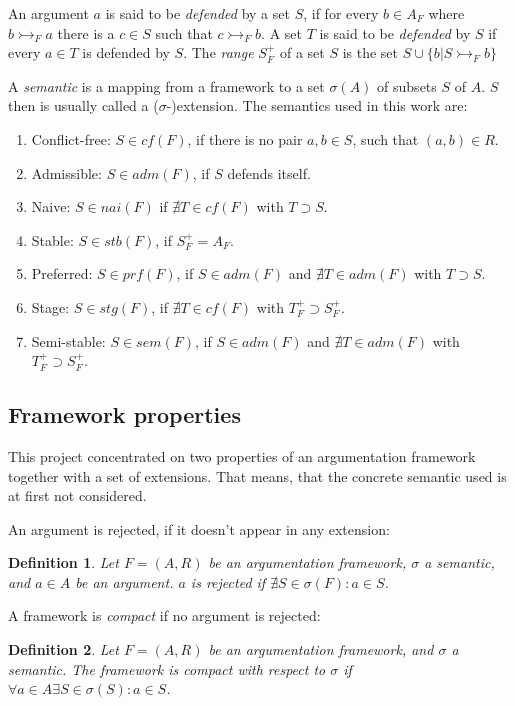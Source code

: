 \documentclass{scrartcl}
\newtheorem{definition}{Definition}
\begin{document}
An argument $a$ is said to be \emph{defended} by a set $S$, if for every $b \in
A_F$ where $b \rightarrowtail_F a$ there is a $c \in S$ such that $c
\rightarrowtail_F b$. A set $T$ is said to be \emph{defended} by $S$ if every
$a \in T$ is defended by $S$. The \emph{range} $S_F^{+}$ of a set $S$ is the
set $S \cup\{b | S \rightarrowtail_F b\}$

A \emph{semantic} is a mapping from a framework to a set $\sigma(A)$ of subsets
$S$ of $A$.  $S$ then is usually called a ($\sigma$-)extension. The semantics
used in this work are:
\begin{enumerate}
  \item Conflict-free: $S \in cf(F)$, if there is no pair $a,b \in S$, such that
      $(a,b) \in R$.
  \item Admissible: $S \in adm(F)$, if $S$ defends itself.
  \item Naive: $S \in nai(F)$ if $\nexists T\in cf(F)$ with $T \supset S$.
  \item Stable: $S \in stb(F)$, if $S_F^{+} = A_F$.
  \item Preferred: $S \in prf(F)$, if $S \in adm(F)$ and $\nexists T\in adm(F)$
      with $T \supset S$.
  \item Stage: $S \in stg(F)$, if $\nexists T\in cf(F)$ with $T_F^{+} \supset
      S_F^{+}$.
  \item Semi-stable: $S \in sem(F)$, if $S \in adm(F)$ and $\nexists T\in
      adm(F)$ with $T_F^{+} \supset S_F^{+}$.
\end{enumerate}

\subsection{Framework properties}

This project concentrated on two properties of an argumentation framework
together with a set of extensions. That means, that the concrete semantic used
is at first not considered.

An argument is rejected, if it doesn't appear in any extension:

\begin{definition}
Let $F=(A,R)$ be an argumentation framework, $\sigma$ a semantic, and $a\in A$
be an argument. $a$ is \emph{rejected} if $\nexists S\in\sigma(F): a\in S$.
\end{definition}

A framework is \emph{compact} if no argument is rejected:

\begin{definition}
Let $F=(A,R)$ be an argumentation framework, and $\sigma$ a semantic.  The
framework is \emph{compact} with respect to $\sigma$ if $\forall a\in A\exists
S\in\sigma(S):a\in S$.
\end{definition}
\end{document}
